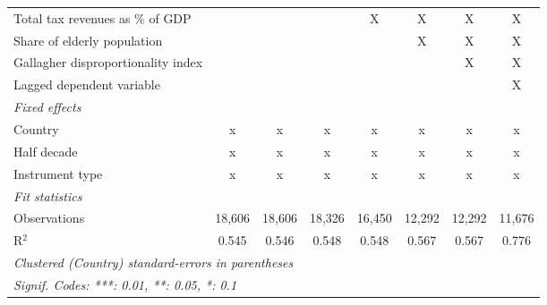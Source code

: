 \begin{table}[htbp]
\begin{tabular}{lccccccc}
      Total tax revenues as \% of GDP                                   &               &               &               & X              & X              & X              & X\\  
      Share of elderly population                                       &               &               &               &                & X              & X              & X\\  
      Gallagher disproportionality index                                &               &               &               &                &                & X              & X\\  
      Lagged dependent variable                                         &               &               &               &                &                &                & X\\  
      \emph{Fixed effects}\\
      Country                                                           & x             & x             & x             & x              & x              & x              & x\\  
      Half decade                                                       & x             & x             & x             & x              & x              & x              & x\\  
      Instrument type                                                   & x             & x             & x             & x              & x              & x              & x\\  
      \midrule \emph{Fit statistics}\\
      Observations                                                      & 18,606        & 18,606        & 18,326        & 16,450         & 12,292         & 12,292         & 11,676\\  
      R$^2$                                                             & 0.545         & 0.546         & 0.548         & 0.548          & 0.567          & 0.567          & 0.776\\  
      \midrule
      \multicolumn{8}{l}{\emph{Clustered (Country) standard-errors in parentheses}}\\
      \multicolumn{8}{l}{\emph{Signif. Codes: ***: 0.01, **: 0.05, *: 0.1}}\\
   \end{tabular}
\end{table}


